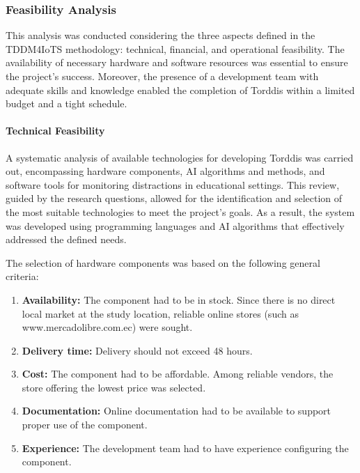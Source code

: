                 \subsubsection{Feasibility Analysis}
                This analysis was conducted considering the three aspects defined in the TDDM4IoTS methodology: technical, financial, and operational feasibility. The availability of necessary hardware and software resources was essential to ensure the project's success. Moreover, the presence of a development team with adequate skills and knowledge enabled the completion of Torddis within a limited budget and a tight schedule.
                
                \paragraph{Technical Feasibility}
                A systematic analysis of available technologies for developing Torddis was carried out, encompassing hardware components, AI algorithms and methods, and software tools for monitoring distractions in educational settings. This review, guided by the research questions, allowed for the identification and selection of the most suitable technologies to meet the project’s goals. As a result, the system was developed using programming languages and AI algorithms that effectively addressed the defined needs.
                
                The selection of hardware components was based on the following general criteria:
                
                \begin{enumerate}
                    \item \textbf{Availability:} The component had to be in stock. Since there is no direct local market at the study location, reliable online stores (such as www.mercadolibre.com.ec) were sought.
                    
                    \item \textbf{Delivery time:} Delivery should not exceed 48 hours.
                    
                    \item \textbf{Cost:} The component had to be affordable. Among reliable vendors, the store offering the lowest price was selected.
                    
                    \item \textbf{Documentation:} Online documentation had to be available to support proper use of the component.
                    
                    \item \textbf{Experience:} The development team had to have experience configuring the component.
                \end{enumerate}
                
